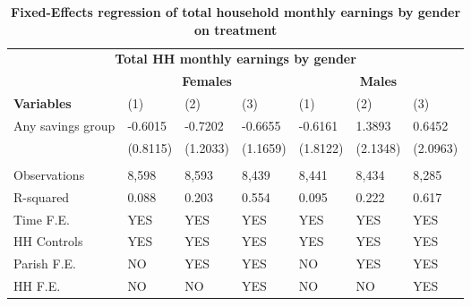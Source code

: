 \begin{table}[!h]
\centering
\begin{tabular}{lllllll}
\hline 
 \multicolumn{7}{c}{\bfseries  Total HH monthly earnings by gender} \\
& \multicolumn{3}{c}{\bfseries  Females} &  
 \multicolumn{3}{c}{\bfseries  Males} \\
\cline{1-7}
 {\bfseries Variables} & (1) & (2) & (3) & (1) & (2) & (3)
 &  \\
 \hline
Any savings group  & -0.6015	& -0.7202 &	-0.6655 &	-0.6161	 & 1.3893 &	0.6452 \\
& (0.8115)	& (1.2033)	& (1.1659)	& (1.8122) &	(2.1348)	& (2.0963) \\
 &  \\
Observations & 8,598 & 8,593 &	8,439	& 8,441 &	8,434 &	8,285 \\
R-squared & 0.088 &	0.203	& 0.554	& 0.095	& 0.222	& 0.617 \\
Time F.E. & YES & YES & YES & YES & YES & YES \\
HH Controls & YES & YES & YES & YES & YES & YES \\
Parish F.E. & NO & YES & YES & NO & YES & YES  \\
HH F.E. & NO & NO & YES & NO & NO & YES \\ \hline
\cline{1-7}
\end{tabular}
\caption{\bfseries Fixed-Effects regression of total household monthly earnings by gender on treatment}
\hline\\
\end{table}





